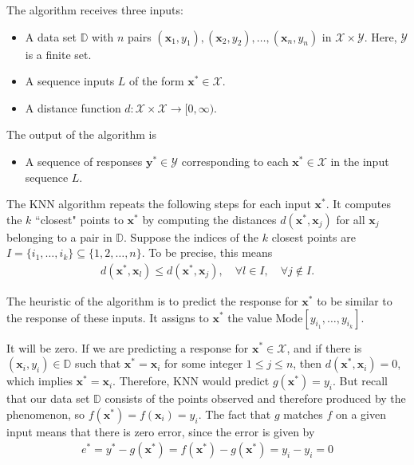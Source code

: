 \documentclass[12pt]{article}
\begin{document}
\begin{enumerate}


The algorithm receives three inputs:
\begin{itemize}
	\item A data set $\mathbb{D}$ with $n$ pairs $(\mathbf{x}_1,y_1),(\mathbf{x}_2,y_2),\ldots,(\mathbf{x}_n,y_n)$ in
	$\mathcal{X}\times\mathcal{Y}$. Here, $\mathcal{Y}$ is a finite set.
	\item A sequence inputs $L$ of the form $\mathbf{x}^*\in \mathcal{X}$.
	\item A distance function $d:\mathcal{X}\times \mathcal{X}\to[0, \infty)$.
\end{itemize}
The output of the algorithm is
\begin{itemize}
	\item A sequence of responses $\mathbf{y}^*\in \mathcal{Y}$ corresponding
	to each $\mathbf{x}^*\in\mathcal{X}$ in the input sequence $L$.
\end{itemize}

The KNN algorithm repeats the following steps for each input $\mathbf{x}^*$. It computes
the $k$ ``closest" points to $\mathbf{x}^*$ by computing the distances $d(\mathbf{x}^*,\mathbf{x}_j)$
for all $\mathbf{x}_j$ belonging to a pair in $\mathbb{D}$. Suppose the indices of the
$k$ closest points are $I=\{i_1,\ldots, i_k\}\subseteq \{1,2,\ldots,n\}$. To be precise, this
means
\begin{align*}
	d(\mathbf{x}^*,\mathbf{x}_l)\leq d(\mathbf{x}^*,\mathbf{x}_j),\quad \forall l\in I,\quad \forall j\notin I.
\end{align*}

The heuristic of the algorithm is to predict the response for $\mathbf{x}^*$ to be similar
to the response of these inputs. It assigns to $\mathbf{x}^*$ the value
$\text{Mode}[y_{i_1},\ldots, y_{i_k}]$.




It will be zero. If we are predicting a response for $\mathbf{x}^*\in \mathcal{X}$,
and if there is $(\mathbf{x}_i, y_i)\in \mathbb{D}$ such that $\mathbf{x}^*=\mathbf{x}_i$
for some integer $1\leq j\leq n$, then $d(\mathbf{x}^*,\mathbf{x}_i)=0$, which implies
$\mathbf{x}^*=\mathbf{x}_i$. Therefore, KNN would predict $g(\mathbf{x}^*)=y_i$. But recall
that our data set $\mathbb{D}$ consists of the points observed and therefore produced by the phenomenon,
so $f(\mathbf{x}^*)=f(\mathbf{x}_i)=y_i$. The fact that $g$ matches $f$ on a given input means
that there is zero error, since the error is given by
\begin{align*}
	e^*=y^*-g(\mathbf{x}^*)=f(\mathbf{x}^*)-g(\mathbf{x}^*)=y_i-y_i=0
\end{align*}


\end{enumerate}
\end{document}
